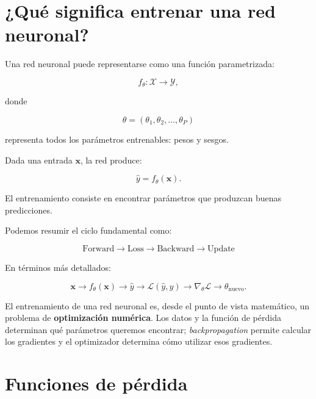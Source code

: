 \documentclass[
  letterpaper,
  DIV=11,
  numbers=noendperiod]{scrartcl}
\begin{document}
\section{¿Qué significa entrenar una red
neuronal?}\label{quuxe9-significa-entrenar-una-red-neuronal}

Una red neuronal puede representarse como una función parametrizada:

\[
f_\theta:\mathcal X\rightarrow\mathcal Y,
\]

donde

\[
\theta=(\theta_1,\theta_2,\ldots,\theta_P)
\]

representa todos los parámetros entrenables: pesos y sesgos.

Dada una entrada \(\mathbf x\), la red produce:

\[
\hat y=f_\theta(\mathbf x).
\]

El entrenamiento consiste en encontrar parámetros que produzcan buenas
predicciones.

Podemos resumir el ciclo fundamental como:

\[
\boxed{
\text{Forward}
\rightarrow
\text{Loss}
\rightarrow
\text{Backward}
\rightarrow
\text{Update}
}
\]

En términos más detallados:

\[
\mathbf x
\rightarrow
f_\theta(\mathbf x)
\rightarrow
\hat y
\rightarrow
\mathcal L(\hat y,y)
\rightarrow
\nabla_\theta\mathcal L
\rightarrow
\theta_{\mathrm{nuevo}}.
\]

\begin{tcolorbox}[enhanced jigsaw, arc=.35mm, bottomrule=.15mm, bottomtitle=1mm, breakable, colback=white, colbacktitle=quarto-callout-important-color!10!white, colframe=quarto-callout-important-color-frame, coltitle=black, left=2mm, leftrule=.75mm, opacityback=0, opacitybacktitle=0.6, rightrule=.15mm, title=\textcolor{quarto-callout-important-color}{\faExclamation}\hspace{0.5em}{Idea central}, titlerule=0mm, toprule=.15mm, toptitle=1mm]

El entrenamiento de una red neuronal es, desde el punto de vista
matemático, un problema de \textbf{optimización numérica}. Los datos y
la función de pérdida determinan qué parámetros queremos encontrar;
\emph{backpropagation} permite calcular los gradientes y el optimizador
determina cómo utilizar esos gradientes.

\end{tcolorbox}

\section{Funciones de pérdida}\label{funciones-de-puxe9rdida}
\end{document}
